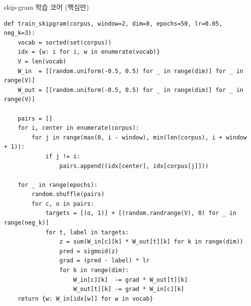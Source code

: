 \begin{frame}[fragile,shrink=18]{skip-gram 학습 코어 (핵심만)}
\begin{lstlisting}
def train_skipgram(corpus, window=2, dim=8, epochs=50, lr=0.05, neg_k=3):
    vocab = sorted(set(corpus))
    idx = {w: i for i, w in enumerate(vocab)}
    V = len(vocab)
    W_in  = [[random.uniform(-0.5, 0.5) for _ in range(dim)] for _ in range(V)]
    W_out = [[random.uniform(-0.5, 0.5) for _ in range(dim)] for _ in range(V)]

    pairs = []
    for i, center in enumerate(corpus):
        for j in range(max(0, i - window), min(len(corpus), i + window + 1)):
            if j != i:
                pairs.append((idx[center], idx[corpus[j]]))

    for _ in range(epochs):
        random.shuffle(pairs)
        for c, o in pairs:
            targets = [(o, 1)] + [(random.randrange(V), 0) for _ in range(neg_k)]
            for t, label in targets:
                z = sum(W_in[c][k] * W_out[t][k] for k in range(dim))
                pred = sigmoid(z)
                grad = (pred - label) * lr
                for k in range(dim):
                    W_in[c][k]  -= grad * W_out[t][k]
                    W_out[t][k] -= grad * W_in[c][k]
    return {w: W_in[idx[w]] for w in vocab}
\end{lstlisting}
  

\end{frame}
